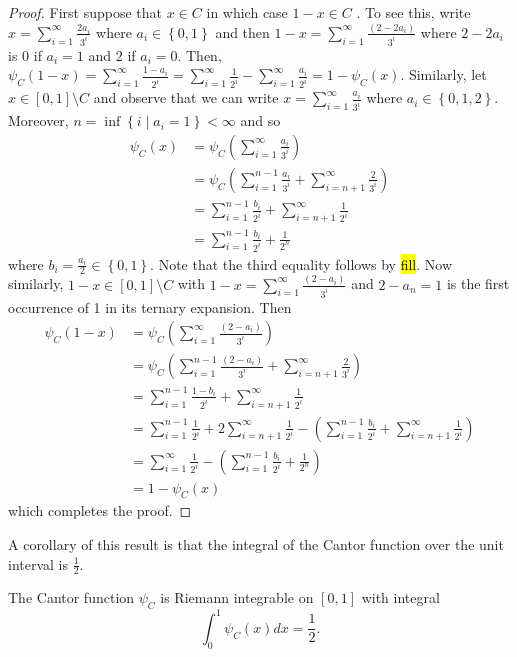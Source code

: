 \begin{proof}
First suppose that $x\in C$ in which case $1-x\in C$ . To see this,
write $x=\sum_{i=1}^{\infty}\frac{2a_{i}}{3^{i}}$ where $a_{i}\in\left\{ 0,1\right\} $
and then $1-x=\sum_{i=1}^{\infty}\frac{\left(2-2a_{i}\right)}{3^{i}}$
where $2-2a_{i}$ is $0$ if $a_{i}=1$ and $2$ if $a_{i}=0$. Then,
$\psi_{C}\left(1-x\right)=\sum_{i=1}^{\infty}\frac{1-a_{i}}{2^{i}}=\sum_{i=1}^{\infty}\frac{1}{2^{i}}-\sum_{i=1}^{\infty}\frac{a_{i}}{2^{i}}=1-\psi_{C}\left(x\right).$
Similarly, let $x\in\left[0,1\right]\setminus C$ and observe that
we can write $x=\sum_{i=1}^{\infty}\frac{a_{i}}{3^{i}}$ where $a_{i}\in\left\{ 0,1,2\right\} $.
Moreover, $n=\inf\left\{ i\mid a_{i}=1\right\} <\infty$ and so 
\begin{align*}
\psi_{C}\left(x\right) & =\psi_{C}\left(\sum_{i=1}^{\infty}\frac{a_{i}}{3^{i}}\right)\\
 & =\psi_{C}\left(\sum_{i=1}^{n-1}\frac{a_{i}}{3^{i}}+\sum_{i=n+1}^{\infty}\frac{2}{3^{i}}\right)\\
 & =\sum_{i=1}^{n-1}\frac{b_{i}}{2^{i}}+\sum_{i=n+1}^{\infty}\frac{1}{2^{i}}\\
 & =\sum_{i=1}^{n-1}\frac{b_{i}}{2^{i}}+\frac{1}{2^{n}}
\end{align*}
where $b_{i}=\frac{a_{i}}{2}\in\left\{ 0,1\right\} .$ Note that the
third equality follows by \hl{fill}. Now similarly, $1-x\in\left[0,1\right]\setminus C$
with $1-x=\sum_{i=1}^{\infty}\frac{\left(2-a_{i}\right)}{3^{i}}$
and $2-a_{n}=1$ is the first occurrence of 1 in its ternary expansion.
Then
\begin{align*}
\psi_{C}\left(1-x\right) & =\psi_{C}\left(\sum_{i=1}^{\infty}\frac{\left(2-a_{i}\right)}{3^{i}}\right)\\
 & =\psi_{C}\left(\sum_{i=1}^{n-1}\frac{\left(2-a_{i}\right)}{3^{i}}+\sum_{i=n+1}^{\infty}\frac{2}{3^{i}}\right)\\
 & =\sum_{i=1}^{n-1}\frac{1-b_{i}}{2^{i}}+\sum_{i=n+1}^{\infty}\frac{1}{2^{i}}\\
 & =\sum_{i=1}^{n-1}\frac{1}{2^{i}}+2\sum_{i=n+1}^{\infty}\frac{1}{2^{i}}-\left(\sum_{i=1}^{n-1}\frac{b_{i}}{2^{i}}+\sum_{i=n+1}^{\infty}\frac{1}{2^{i}}\right)\\
 & =\sum_{i=1}^{\infty}\frac{1}{2^{i}}-\left(\sum_{i=1}^{n-1}\frac{b_{i}}{2^{i}}+\frac{1}{2^{n}}\right)\\
 & =1-\psi_{C}\left(x\right)
\end{align*}
which completes the proof.
\end{proof}
A corollary of this result is that the integral of the Cantor function
over the unit interval is $\frac{1}{2}.$
\begin{cor}
\label{cor:cantorIntegral}The Cantor function $\psi_{C}$ is Riemann
integrable on $\left[0,1\right]$ with integral
\[
\int_{0}^{1}\psi_{C}\left(x\right)dx=\frac{1}{2}.
\]
\end{cor}

